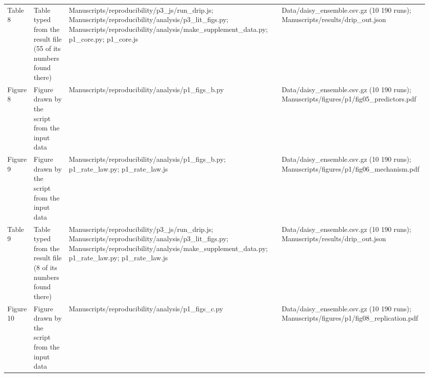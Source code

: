{\begin{longtable}{p{}p{}p{}p{}}
{}Table 8 & Table typed from the result file (55 of its numbers found there) & Manuscripts/\allowbreak{}reproducibility/\allowbreak{}p3\_\allowbreak{}js/\allowbreak{}run\_\allowbreak{}drip.js;  Manuscripts/\allowbreak{}reproducibility/\allowbreak{}analysis/\allowbreak{}p3\_\allowbreak{}lit\_\allowbreak{}figs.py;  Manuscripts/\allowbreak{}reproducibility/\allowbreak{}analysis/\allowbreak{}make\_\allowbreak{}supplement\_\allowbreak{}data.py;  p1\_\allowbreak{}core.py;  p1\_\allowbreak{}core.js & Data/\allowbreak{}daisy\_\allowbreak{}ensemble.csv.gz (10 190 runs);  Manuscripts/\allowbreak{}results/\allowbreak{}drip\_\allowbreak{}out.json\\
{}Figure 8 & Figure drawn by the script from the input data & Manuscripts/\allowbreak{}reproducibility/\allowbreak{}analysis/\allowbreak{}p1\_\allowbreak{}figs\_\allowbreak{}b.py & Data/\allowbreak{}daisy\_\allowbreak{}ensemble.csv.gz (10 190 runs);  Manuscripts/\allowbreak{}figures/\allowbreak{}p1/\allowbreak{}fig05\_\allowbreak{}predictors.pdf\\
{}Figure 9 & Figure drawn by the script from the input data & Manuscripts/\allowbreak{}reproducibility/\allowbreak{}analysis/\allowbreak{}p1\_\allowbreak{}figs\_\allowbreak{}b.py;  p1\_\allowbreak{}rate\_\allowbreak{}law.py;  p1\_\allowbreak{}rate\_\allowbreak{}law.js & Data/\allowbreak{}daisy\_\allowbreak{}ensemble.csv.gz (10 190 runs);  Manuscripts/\allowbreak{}figures/\allowbreak{}p1/\allowbreak{}fig06\_\allowbreak{}mechanism.pdf\\
{}Table 9 & Table typed from the result file (8 of its numbers found there) & Manuscripts/\allowbreak{}reproducibility/\allowbreak{}p3\_\allowbreak{}js/\allowbreak{}run\_\allowbreak{}drip.js;  Manuscripts/\allowbreak{}reproducibility/\allowbreak{}analysis/\allowbreak{}p3\_\allowbreak{}lit\_\allowbreak{}figs.py;  Manuscripts/\allowbreak{}reproducibility/\allowbreak{}analysis/\allowbreak{}make\_\allowbreak{}supplement\_\allowbreak{}data.py;  p1\_\allowbreak{}rate\_\allowbreak{}law.py;  p1\_\allowbreak{}rate\_\allowbreak{}law.js & Data/\allowbreak{}daisy\_\allowbreak{}ensemble.csv.gz (10 190 runs);  Manuscripts/\allowbreak{}results/\allowbreak{}drip\_\allowbreak{}out.json\\
{}Figure 10 & Figure drawn by the script from the input data & Manuscripts/\allowbreak{}reproducibility/\allowbreak{}analysis/\allowbreak{}p1\_\allowbreak{}figs\_\allowbreak{}c.py & Data/\allowbreak{}daisy\_\allowbreak{}ensemble.csv.gz (10 190 runs);  Manuscripts/\allowbreak{}figures/\allowbreak{}p1/\allowbreak{}fig08\_\allowbreak{}replication.pdf\\

\end{longtable}}
